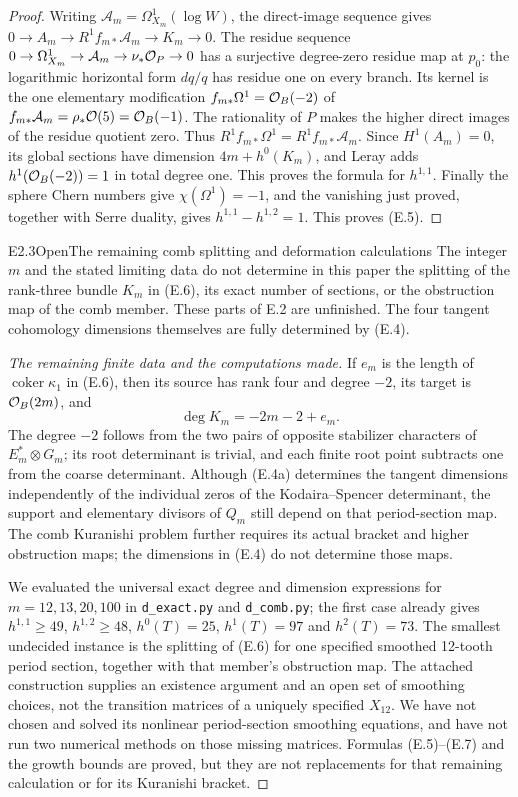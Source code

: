 \begin{proof}
Writing $\mathcal A_m=\Omega^1_{X_m}(\log W)$, the direct-image
sequence gives
$0\to A_m\to R^1f_{m*}\mathcal A_m\to K_m\to0$.
The residue sequence
$0\to\Omega^1_{X_m}\to\mathcal A_m\to\nu_*\mathcal O_P\to0$
has a surjective degree-zero residue map at $p_0$: the logarithmic
horizontal form $dq/q$ has residue one on every branch. Its kernel
is the one elementary modification
$f_{m*}\Omega^1=\mathcal O_B(-2)$ of
$f_{m*}\mathcal A_m=\rho_*\mathcal O(5)=\mathcal O_B(-1)$.
The rationality of $P$ makes the higher direct images of the
residue quotient zero. Thus
$R^1f_{m*}\Omega^1=R^1f_{m*}\mathcal A_m$.
Since $H^1(A_m)=0$, its global sections have dimension
$4m+h^0(K_m)$, and Leray adds
$h^1(\mathcal O_B(-2))=1$ in total degree one. This proves the formula
for $h^{1,1}$. Finally the sphere Chern numbers give
$\chi(\Omega^1)=-1$, and the vanishing just proved, together with
Serre duality, gives $h^{1,1}-h^{1,2}=1$. This proves (E.5).
\end{proof}

\begin{claim}{E2.3}{Open}{The remaining comb splitting and deformation calculations}
The integer $m$ and the stated limiting data do not determine in
this paper the splitting of the rank-three bundle $K_m$ in (E.6),
its exact number of sections, or the obstruction map of the comb
member. These parts of E.2 are unfinished. The four tangent
cohomology dimensions themselves are fully determined by (E.4).
\end{claim}
\begin{proof}[The remaining finite data and the computations made]
If $e_m$ is the length of $\operatorname{coker}\kappa_1$ in (E.6),
then its source has rank four and degree $-2$, its target is
$\mathcal O_B(2m)$, and
\[
 \deg K_m=-2m-2+e_m.                                  \tag{E.7}
\]
The degree $-2$ follows from the two pairs of opposite stabilizer
characters of $E_m^*\otimes G_m$; its root determinant is trivial,
and each finite root point subtracts one from the coarse determinant.
Although (E.4a) determines the tangent dimensions independently of
the individual zeros of the Kodaira--Spencer determinant, the
support and elementary divisors of $Q_m$ still depend on that
period-section map. The comb Kuranishi problem further requires
its actual bracket and higher obstruction maps; the dimensions in
(E.4) do not determine those maps.

We evaluated the universal exact degree and dimension expressions
for $m=12,13,20,100$ in \texttt{d\_exact.py} and
\texttt{d\_comb.py}; the first case already
gives $h^{1,1}\ge49$, $h^{1,2}\ge48$, $h^0(T)=25$,
$h^1(T)=97$ and $h^2(T)=73$. The smallest undecided instance
is the splitting of (E.6) for one specified smoothed 12-tooth period
section, together with that member's obstruction map. The
attached construction supplies an existence argument and an open
set of smoothing choices, not the transition matrices of a uniquely
specified $X_{12}$. We have not chosen and solved its nonlinear
period-section smoothing equations, and have not run two numerical
methods on those missing matrices. Formulas (E.5)--(E.7) and the
growth bounds are proved, but they are not replacements for that
remaining calculation or for its Kuranishi bracket.
\end{proof}

